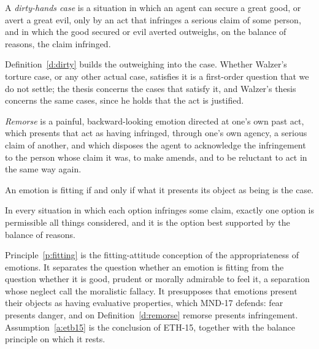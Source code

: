 \documentclass{situationist-preprint}
\begin{document}
\begin{definition}\label{d:dirty}
A \emph{dirty-hands case} is a situation in which an agent can secure a great good, or avert a great evil, only by an act that infringes a serious claim of some person, and in which the good secured or evil averted outweighs, on the balance of reasons, the claim infringed.
\end{definition}

Definition~\ref{d:dirty} builds the outweighing into the case. Whether Walzer's torture case, or any other actual case, satisfies it is a first-order question that we do not settle; the thesis concerns the cases that satisfy it, and Walzer's thesis concerns the same cases, since he holds that the act is justified.

\begin{definition}[Remorse]\label{d:remorse}
\emph{Remorse} is a painful, backward-looking emotion directed at one's own past act, which presents that act as having infringed, through one's own agency, a serious claim of another, and which disposes the agent to acknowledge the infringement to the person whose claim it was, to make amends, and to be reluctant to act in the same way again.
\end{definition}

\begin{principle}[Fittingness]\label{p:fitting}
An emotion is fitting if and only if what it presents its object as being is the case.
\end{principle}

\begin{assumption}[No dilemmas]\label{a:etb15}
In every situation in which each option infringes some claim, exactly one option is permissible all things considered, and it is the option best supported by the balance of reasons.
\end{assumption}

Principle~\ref{p:fitting} is the fitting-attitude conception of the appropriateness of emotions. It separates the question whether an emotion is fitting from the question whether it is good, prudent or morally admirable to feel it, a separation whose neglect \citet{DArmsJacobson2000} call the moralistic fallacy. It presupposes that emotions present their objects as having evaluative properties, which MND-17 defends: fear presents danger, and on Definition~\ref{d:remorse} remorse presents infringement. Assumption~\ref{a:etb15} is the conclusion of ETH-15, together with the balance principle on which it rests.
\end{document}
